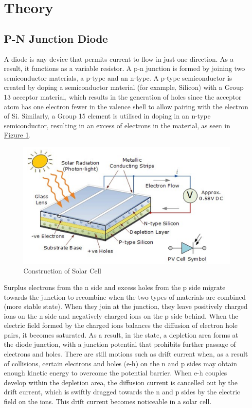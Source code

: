 \section{Theory}
	\subsection{P-N Junction Diode}
		A diode is any device that permits current to flow in just one direction. As a result, it functions as a variable resistor. A p-n junction is formed by joining two semiconductor materials, a p-type and an n-type. A p-type semiconductor is created by doping a semiconductor material (for example, Silicon) with a Group 13 acceptor material, which results in the generation of holes since the acceptor atom has one electron fewer in the valence shell to allow pairing with the electron of Si. Similarly, a Group 15 element is utilised in doping in an n-type semiconductor, resulting in an excess of electrons in the material, as seen in \hyperref[fig:1]{Figure 1}.

		\begin{figure}[h]
			\centering
			\includegraphics[width=0.8\columnwidth]{images/theory1.png}
			\caption{Construction of Solar Cell}
			\label{fig:1}
		\end{figure}
		
		Surplus electrons from the n side and excess holes from the p side migrate towards the junction to recombine when the two types of materials are combined (more stable state). When they join at the junction, they leave positively charged ions on the n side and negatively charged ions on the p side behind. When the electric field formed by the charged ions balances the diffusion of electron hole pairs, it becomes saturated. As a result, in the state, a depletion area forms at the diode junction, with a junction potential that prohibits further passage of electrons and holes. There are still motions such as drift current when, as a result of collisions, certain electrons and holes (e-h) on the n and p sides may obtain enough kinetic energy to overcome the potential barrier. When e-h couples develop within the depletion area, the diffusion current is cancelled out by the drift current, which is swiftly dragged towards the n and p sides by the electric field on the ions. This drift current becomes noticeable in a solar cell.

